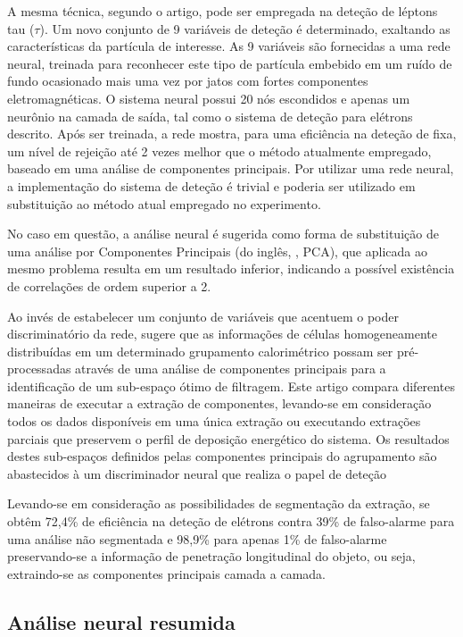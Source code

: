 A mesma técnica, segundo o artigo, pode ser empregada na deteção de léptons
tau ($\tau$). Um novo conjunto de 9 variáveis de deteção é determinado,
exaltando as características da partícula de interesse. As 9 variáveis são
fornecidas a uma rede neural, treinada para reconhecer este tipo de partícula
embebido em um ruído de fundo ocasionado mais uma vez por jatos com fortes
componentes eletromagnéticas. O sistema neural possui 20 nós escondidos e
apenas um neurônio na camada de saída, tal como o sistema de deteção para
elétrons descrito. Após ser treinada, a rede mostra, para uma eficiência na
deteção de  fixa, um nível de rejeição até 2 vezes melhor que o
método atualmente empregado, baseado em uma análise de componentes
principais. Por utilizar uma rede neural, a implementação do sistema de
deteção é trivial e poderia ser utilizado em substituição ao método atual
empregado no experimento.

No caso em questão, a análise neural é sugerida como forma de substituição de
uma análise por Componentes Principais (do inglês, , PCA), que aplicada ao mesmo problema resulta em um resultado
inferior, indicando a possível existência de correlações de ordem superior a
2. 

Ao invés de estabelecer um conjunto de variáveis que acentuem o poder
discriminatório da rede, \cite{vassali-acat-2001} sugere que as informações de
células homogeneamente distribuídas em um determinado grupamento calorimétrico
possam ser pré-processadas através de uma análise de componentes principais
para a identificação de um sub-espaço ótimo de filtragem. Este artigo compara
diferentes maneiras de executar a extração de componentes, levando-se em
consideração todos os dados disponíveis em uma única extração ou executando
extrações parciais que preservem o perfil de deposição energético do
sistema. Os resultados destes sub-espaços definidos pelas componentes
principais do agrupamento são abastecidos à um discriminador neural que
realiza o papel de deteção

Levando-se em consideração as possibilidades de segmentação da extração, se
obtêm 72,4\% de eficiência na deteção de elétrons contra 39\% de falso-alarme
para uma análise não segmentada e 98,9\% para apenas 1\% de falso-alarme
preservando-se a informação de penetração longitudinal do objeto, ou seja,
extraindo-se as componentes principais camada a camada.

\subsection{Análise neural resumida}

